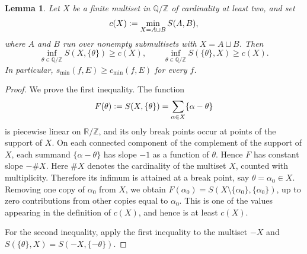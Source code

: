\documentclass[11pt]{amsart}
\theoremstyle{plain}
\newtheorem{lem}[thm]{Lemma}
\theoremstyle{definition}
\numberwithin{equation}{section}
\newcommand{\defeq}{\vcentcolon=}
\begin{document}
\begin{lem}\label{lem:external-point-bound}
Let $X$ be a finite multiset in $\mathbb Q/\mathbb Z$ of cardinality at least two, and set
\[
c(X)\defeq \min_{X=A\sqcup B}S(A,B),
\]
where $A$ and $B$ run over nonempty submultisets with $X=A\sqcup B$.
Then
\[
\inf_{\theta\in\mathbb Q/\mathbb Z} S(X,\{\theta\})\geq c(X),
\qquad
\inf_{\theta\in\mathbb Q/\mathbb Z} S(\{\theta\},X)\geq c(X).
\]
In particular, $s_{\min}(f,E)\geq c_{\min}(f,E)$ for every $f$.
\end{lem}

\begin{proof}
We prove the first inequality.
The function
\[
F(\theta)\defeq S(X,\{\theta\})=\sum_{\alpha\in X}\{\alpha-\theta\}
\]
is piecewise linear on $\mathbb R/\mathbb Z$, and its only break points occur at points of the support of $X$.
On each connected component of the complement of the support of $X$,
each summand $\{\alpha-\theta\}$ has slope $-1$ as a function of
$\theta$.  Hence $F$ has constant slope $-\#X$. Here $\#X$ denotes the cardinality of the multiset $X$, counted with
multiplicity.
Therefore its infimum is attained at a break point, say $\theta=\alpha_0\in X$.
Removing one copy of $\alpha_0$ from $X$, we obtain $F(\alpha_0)=S(X\setminus\{\alpha_0\},\{\alpha_0\})$,
up to zero contributions from other copies equal to $\alpha_0$.
This is one of the values appearing in the definition of $c(X)$, and hence is at least $c(X)$.

For the second inequality, apply the first inequality to the
multiset $-X$ and $S(\{\theta\}, X) = S(-X, \{-\theta\})$. 
\end{proof}
\end{document}
